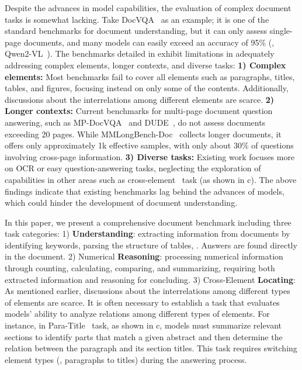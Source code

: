 Despite the advances in model capabilities, the evaluation of complex document tasks is somewhat lacking. Take DocVQA~\cite{DocVQA} as an example; it is one of the standard benchmarks for document understanding, but it can only assess single-page documents, and many models can easily exceed an accuracy of 95\% (\eg, Qwen2-VL~\cite{Qwen2-VL}). The benchmarks detailed in  exhibit limitations in adequately addressing complex elements, longer contexts, and diverse tasks: \textbf{1) Complex elements:} Most benchmarks fail to cover all elements such as paragraphs, titles, tables, and figures, focusing instead on only some of the contents. Additionally, discussions about the interrelations among different elements are scarce. \textbf{2) Longer contexts:} Current benchmarks for multi-page document question answering, such as MP-DocVQA~\cite{MP-DocVQA} and DUDE~\cite{DUDE}, do not assess documents exceeding 20 pages. While MMLongBench-Doc~\cite{MMLongBench-Doc} collects longer documents, it offers only approximately 1k effective samples, with only about 30\% of questions involving cross-page information. \textbf{3) Diverse tasks:} Existing work focuses more on OCR or easy question-answering tasks, neglecting the exploration of capabilities in other areas such as cross-element \locating~task (as shown in c). The above findings indicate that existing benchmarks lag behind the advances of models, which could hinder the development of document understanding.



In this paper, we present a comprehensive document benchmark including three task categories: 1) \textbf{Understanding}: extracting information from documents by identifying keywords, parsing the structure of tables, \etc. Answers are found directly in the document. 2) Numerical \textbf{Reasoning}: processing numerical information through counting, calculating, comparing, and summarizing, requiring both extracted information and reasoning for concluding. 3) Cross-Element \textbf{Locating}: As mentioned earlier, discussions about the interrelations among different types of elements are scarce. It is often necessary to establish a task that evaluates models' ability to analyze relations among different types of elements. For instance, in Para-Title \Locating~task, as shown in c, models must summarize relevant sections to identify parts that match a given abstract and then determine the relation between the paragraph and its section titles. This task requires switching element types (\ie, paragraphs to titles) during the answering process.



